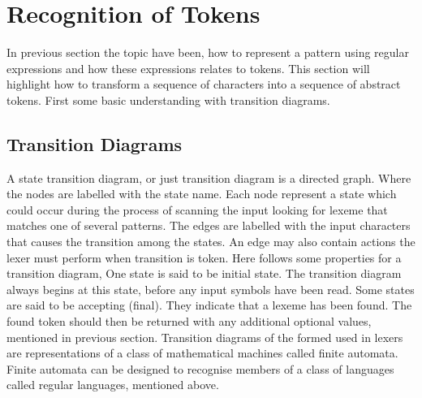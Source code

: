 \section{Recognition of Tokens}
In previous section the topic have been, how to represent a pattern using 
regular expressions and how these expressions relates to tokens. This section 
will highlight how to transform a sequence of characters into a sequence of 
abstract tokens. First some basic understanding with transition diagrams.  
\subsection{Transition Diagrams}
A state transition diagram, or just transition diagram is a directed graph. 
Where the nodes are labelled with the state name. Each node 
represent a state which could occur during the process of scanning the input 
looking for lexeme that matches one of several patterns.\cite{Aho2006} The 
edges are labelled with the input characters that causes the transition among 
the states. An edge may also contain actions the lexer must perform when 
transition is token.\cite{sebesta2012} Here follows some properties for a 
transition diagram, One state is said to be initial state. The transition 
diagram always begins at this state, before any input symbols have been read. 
Some states are said to be accepting (final). They indicate that a lexeme has 
been found. The found token should then be returned with any additional 
optional values, mentioned in previous section.\cite{Aho2006}
Transition diagrams of the formed used in lexers are representations of a class 
of mathematical machines called finite automata. Finite automata can be 
designed to recognise members of a class of languages called regular languages, 
mentioned above.
\cite{sebesta2012} 
